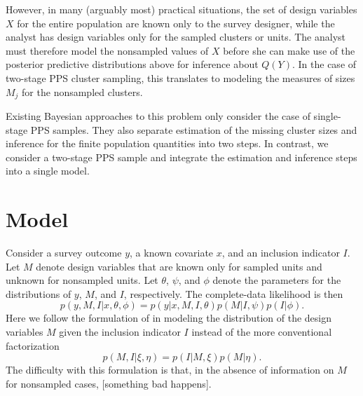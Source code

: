 \documentclass[12pt,a4paper]{article}
\begin{document}

However, in many (arguably most) practical situations, the set of design variables $X$ for the entire population are known only to the survey designer, while the analyst has design variables only for the sampled clusters or units. The analyst must therefore model the nonsampled values of $X$ before she can make use of the posterior predictive distributions above for inference about $Q(Y)$. In the case of two-stage PPS cluster sampling, this translates to modeling the measures of sizes $M_j$ for the nonsampled clusters.

Existing Bayesian approaches to this problem \citep{zangeneh2011, zangeneh2015} only consider the case of single-stage PPS samples. They also separate estimation of the missing cluster sizes and inference for the finite population quantities into two steps. In contrast, we consider a two-stage PPS sample and integrate the estimation and inference steps into a single model.

\section*{Model}
Consider a survey outcome $y$, a known covariate $x$, and an inclusion indicator $I$. Let $M$ denote design variables that are known only for sampled units and unknown for nonsampled units. Let $\theta$, $\psi$, and $\phi$ denote the parameters for the distributions of $y$, $M$, and $I$, respectively. The complete-data likelihood is then
\[
	p(y, M, I | x, \theta, \phi) = p(y | x, M, I, \theta) p(M | I, \psi) p(I | \phi).
\]
Here we follow the formulation of \cite{zangeneh2015} in modeling the distribution of the design variables $M$ given the inclusion indicator $I$ instead of the more conventional factorization
\[
	p(M, I | \xi, \eta) = p(I | M, \xi) p(M | \eta).
\]
The difficulty with this formulation is that, in the absence of information on $M$ for nonsampled cases, [something bad happens].
\end{document}
